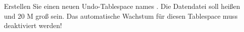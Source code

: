     \item Erstellen Sie einen neuen Undo-Tablespace names . Die Datendatei soll  heißen und 20 M groß sein. Das automatische Wachstum für diesen Tablespace muss deaktiviert werden!
